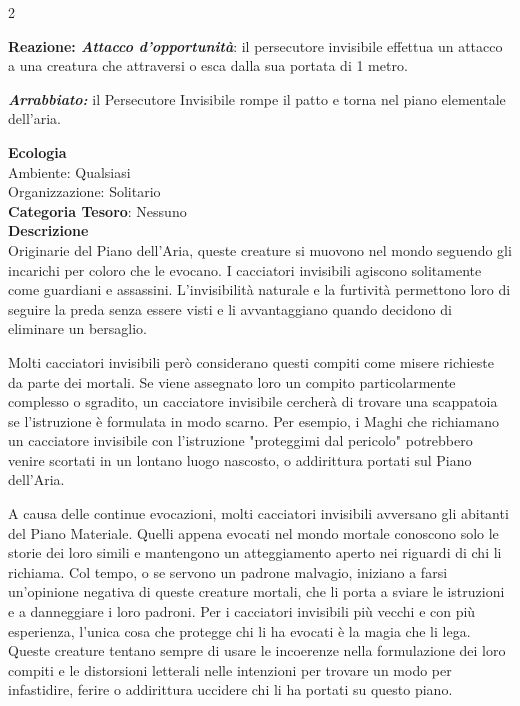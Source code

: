 \begin{multicols}{2}
{\textbf{Reazione: \emph{Attacco d'opportunità}}: il persecutore invisibile effettua un attacco a una creatura che attraversi o esca dalla sua portata di 1 metro.

\emph{\textbf{Arrabbiato:}} il Persecutore Invisibile rompe il patto e torna nel piano elementale dell'aria.

\textbf{Ecologia}\\
Ambiente: Qualsiasi\\
Organizzazione: Solitario\\
\textbf{Categoria Tesoro}: Nessuno\\
\textbf{Descrizione}\\
Originarie del Piano dell'Aria, queste creature si muovono nel mondo seguendo gli incarichi per coloro che le evocano. I cacciatori invisibili agiscono solitamente come guardiani e assassini. L'invisibilità naturale e la furtività permettono loro di seguire la preda senza essere visti e li avvantaggiano quando decidono di eliminare un bersaglio.

Molti cacciatori invisibili però considerano questi compiti come misere richieste da parte dei mortali. Se viene assegnato loro un compito particolarmente complesso o sgradito, un cacciatore invisibile cercherà di trovare una scappatoia se l'istruzione è formulata in modo scarno. Per esempio, i Maghi che richiamano un cacciatore invisibile con l'istruzione "proteggimi dal pericolo" potrebbero venire scortati in un lontano luogo nascosto, o addirittura portati sul Piano dell'Aria.

A causa delle continue evocazioni, molti cacciatori invisibili avversano gli abitanti del Piano Materiale. Quelli appena evocati nel mondo mortale conoscono solo le storie dei loro simili e mantengono un atteggiamento aperto nei riguardi di chi li richiama. Col tempo, o se servono un padrone malvagio, iniziano a farsi un'opinione negativa di queste creature mortali, che li porta a sviare le istruzioni e a danneggiare i loro padroni. Per i cacciatori invisibili più vecchi e con più esperienza, l'unica cosa che protegge chi li ha evocati è la magia che li lega. Queste creature tentano sempre di usare le incoerenze nella formulazione dei loro compiti e le distorsioni letterali nelle intenzioni per trovare un modo per infastidire, ferire o addirittura uccidere chi li ha portati su questo piano.

}
\end{multicols}
